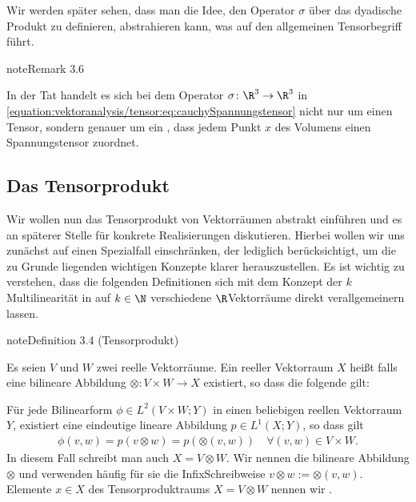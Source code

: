 \documentclass[letterpaper,10pt,german]{jupyterBook}
\begin{document}
\sphinxAtStartPar
Wir werden später sehen, dass man die Idee, den Operator \(\sigma\) über das dyadische Produkt zu definieren, abstrahieren kann, was auf den allgemeinen Tensorbegriff führt.
\label{vektoranalysis/tensor:remark-1}
\begin{sphinxadmonition}{note}{Remark 3.6}



\sphinxAtStartPar
In der Tat handelt es sich bei dem Operator \(\sigma \colon \R^3 \rightarrow \R^3\) in \eqref{equation:vektoranalysis/tensor:eq:cauchySpannungstensor} nicht nur um einen Tensor, sondern genauer um ein , dass jedem Punkt \(x\) des Volumens einen Spannungstensor zuordnet.
\end{sphinxadmonition}


\subsection{Das Tensorprodukt}
\label{\detokenize{vektoranalysis/tensor:das-tensorprodukt}}
\sphinxAtStartPar
Wir wollen nun das Tensorprodukt von Vektorräumen abstrakt einführen und es an späterer Stelle für konkrete Realisierungen diskutieren.
Hierbei wollen wir uns zunächst auf einen Spezialfall einschränken, der lediglich  berücksichtigt, um die zu Grunde liegenden wichtigen Konzepte klarer herauszustellen.
Es ist wichtig zu verstehen, dass die folgenden Definitionen sich mit dem Konzept der \(k\)\sphinxhyphen{}Multilinearität in {\hyperref[\detokenize{vektoranalysis/multilinear:s-multilinearformen}]{}} auf \(k \in \N\) verschiedene \(\R\)\sphinxhyphen{}Vektorräume direkt verallgemeinern lassen.
\label{vektoranalysis/tensor:def:tensor}
\begin{sphinxadmonition}{note}{Definition 3.4 (Tensorprodukt)}



\sphinxAtStartPar
Es seien \(V\) und \(W\) zwei reelle Vektorräume.
Ein reeller Vektorraum \(X\) heißt  falls eine bilineare Abbildung \(\otimes:V\times W\rightarrow X\) existiert, so dass die folgende  gilt:

\sphinxAtStartPar
Für jede Bilinearform \(\phi\in L^2(V\times W; Y)\) in einen beliebigen reellen Vektorraum \(Y\), existiert eine eindeutige lineare Abbildung
\(p \in L^1(X; Y)\), so dass gilt
\begin{equation}\label{equation:vektoranalysis/tensor:eq:universell}
\begin{split}\phi(v,w) = p(v\otimes w) = p(\otimes(v,w))\quad\forall (v,w)\in V\times W.\end{split}
\end{equation}
\sphinxAtStartPar
In diesem Fall schreibt man auch \(X = V \otimes W\).
Wir nennen die bilineare Abbildung \(\otimes\)  und verwenden häufig für sie die Infix\sphinxhyphen{}Schreibweise \(v\otimes w := \otimes(v,w)\).
Elemente \(x \in X\) des Tensorproduktraums \(X = V \otimes W\) nennen wir .
\end{sphinxadmonition}
\end{document}
